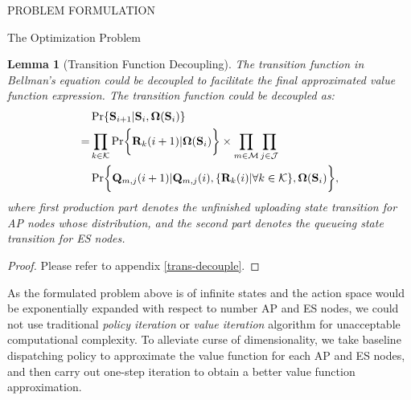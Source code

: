 \documentclass[10pt, conference, letterpaper]{IEEEtran}
\newtheorem{lemma}{Lemma}
\renewcommand{\vec}{\mathbf}
\DeclarePairedDelimiter{\set}{\{}{\}}
\DeclarePairedDelimiter{\Brace}{\bigg\{}{\bigg\}}
\newcommand{\apSet}{\mathcal{K}}
\newcommand{\esSet}{\mathcal{M}}
\newcommand{\jSpace}{\mathcal{J}}
\newcommand{\Stat}{\mathbf{S}}
\newcommand{\Policy}{\mathbf{\Omega}}
\begin{document}
\begin{section}{PROBLEM FORMULATION}
\begin{subsection}{The Optimization Problem}
            \begin{lemma}[Transition Function Decoupling]
                The transition function in Bellman's equation could be decoupled to facilitate the final approximated value function expression. The transition function could be decoupled as:
                \begin{align}
                    & \Pr\{\Stat_{i+1}|\Stat_{i}, \Policy(\Stat_{i})\} 
                    \nonumber\\
                    =& \prod_{k\in\apSet} \Pr\Brace{\vec{R}_k(i+1)|\Policy(\Stat_{i})} \times \prod_{m\in\esSet}\prod_{j\in\jSpace}
                        \nonumber\\
                        & \Pr \Brace{\vec{Q}_{m,j}(i+1)|\vec{Q}_{m,j}(i), \set{\vec{R}_k(i)|\forall k\in\apSet}, \Policy(\Stat_{i})},
                \end{align}
                where first production part denotes the unfinished uploading state transition for AP nodes whose distribution, and the second part denotes the queueing state transition for ES nodes.
            \end{lemma}
            \begin{proof}
                Please refer to appendix \ref{trans-decouple}.
            \end{proof}

            As the formulated problem above is of infinite states and the action space would be exponentially expanded with respect to number AP and ES nodes, we could not use traditional \emph{policy iteration} or \emph{value iteration} algorithm \cite{sutton1998introduction} for unacceptable computational complexity. To alleviate curse of dimensionality, we take baseline dispatching policy to approximate the value function for each AP and ES nodes, and then carry out one-step iteration to obtain a better value function approximation.
        \end{subsection}
    \end{section}
\end{document}
